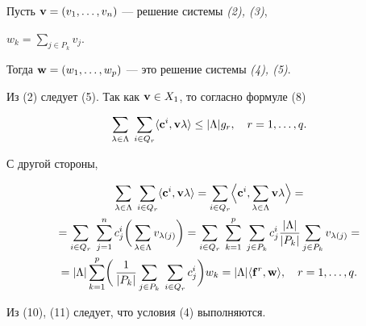 \begin{thm}


Пусть $\bold v=(v_1,\dotsc,v_n)$ --- решение системы {\em (2), (3)},


$w_k=\sum\limits_{j\in P_k}v_j$.


Тогда $\bold w=(w_1,\dotsc,w_p)$ --- это решение системы {\em (4), (5)}.


\end{thm}





\begin{pf}


Из (2) следует (5). Так как $\bold v\in X_1$, то согласно формуле (8)


\begin{equation}


\sum_{\lambda\in\Lambda}\;\sum_{i\in Q_r}


\la\bold c^i,\bold v\lambda\ra\le |\Lambda|g_r,\quad


r=1,\dotsc,q.


\end{equation}


С другой стороны,


\begin{multline}


\sum_{\lambda\in\Lambda}\;\sum_{i\in Q_r}


\la\bold c^i,\bold v\lambda\ra=\sum_{i\in Q_r}\Bigl\la


\bold c^i,\sum_{\lambda\in\Lambda}\bold v\lambda\Bigr\ra=\\


=\sum_{i\in Q_r}\;\sum^n_{j=1}c^i_j\biggl(\,


\sum_{\lambda\in\Lambda}v_{\lambda(j)}\biggr)=\sum_{i\in Q_r}\;


\sum^p_{k=1}\;\sum_{j\in P_k}c^i_j


\frac{|\Lambda|}{|P_k|}\sum_{j\in P_k}v_{\lambda(j)}=\\


=|\Lambda|\sum^p_{k=1}\biggl(\,\frac{1}{|P_k|}


\sum_{j\in P_k}\;\sum_{i\in Q_r}c^i_j\biggr)w_k=


|\Lambda|\la\bold f^r,\bold w\ra,\quad r=1,\dotsc,q.


\end{multline}


Из (10), (11) следует, что условия (4) выполняются.


\end{pf}





